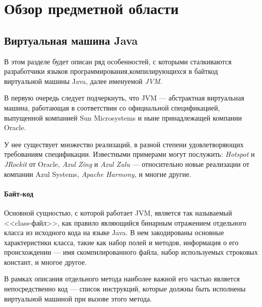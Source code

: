 \section{Обзор предметной области}

\subsection{Виртуальная машина Java}

В этом разделе будет описан ряд особенностей, с которыми сталкиваются разработчики языков
программирования,компилирующихся в байткод виртуальной машины Java, далее именуемой \textit{JVM}.

В первую очередь следует подчеркнуть, что JVM --- абстрактная виртуальная машина, работающая
в соответствии со официальной спецификацией, выпущенной компанией Sun Microsystems и ныне
принадлежащей компании Oracle. %

У нее существует множество реализаций, в разной степени удовлетворяющих требованиям спецификации.
Известными примерами могут послужить: \textit{Hotspot} и \textit{JRockit} от Oracle, \textit{Azul Zing}
и \textit{Azul Zulu} --- относительно новые реализации от компании Azul Systems, \textit{Apache Harmony},
и многие другие.

\paragraph{Байт-код}

Основной сущностью, с которой работает JVM, является так называемый <<class-файл>>, как правило являющийся
бинарным отражением отдельного класса из исходного кода на языке Java. В нем закодированы основные
характеристики класса, такие как набор полей и методов, информация о его происхождении --- имя
скомпилированного файла, набор используемых строковых констант, и многое другое.

В рамках описания отдельного метода наиболее важной его частью является непосредственно код --- список
инструкций, которые должны быть исполнены виртуальной машиной при вызове этого метода.

